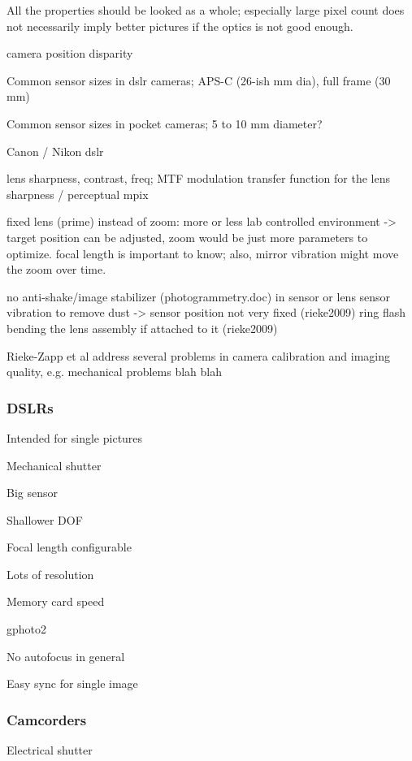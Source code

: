 All the properties should be looked as a whole; especially large pixel count does not necessarily imply better pictures if the optics is not good enough.

camera position disparity

Common sensor sizes in dslr cameras; APS-C (26-ish mm dia), full frame (30 mm)

Common sensor sizes in pocket cameras; 5 to 10 mm diameter?

Canon / Nikon dslr


lens sharpness, contrast, freq; MTF modulation transfer function for the lens sharpness / perceptual mpix

fixed lens (prime) instead of zoom: more or less lab controlled environment -> target position can be adjusted, zoom would be just more parameters to optimize. focal length is important to know; also, mirror vibration might move the zoom over time.

no anti-shake/image stabilizer (photogrammetry.doc) in sensor or lens
sensor vibration to remove dust -> sensor position not very fixed (rieke2009) %
ring flash bending the lens assembly if attached to it (rieke2009)

Rieke-Zapp et al \cite{rieke2009evaluation} address several problems in camera calibration and imaging quality, e.g. mechanical problems blah blah

\subsubsection{DSLRs}

Intended for single pictures

Mechanical shutter

Big sensor

Shallower DOF

Focal length configurable

Lots of resolution

Memory card speed

gphoto2

No autofocus in general

Easy sync for single image

\subsubsection{Camcorders}

Electrical shutter

